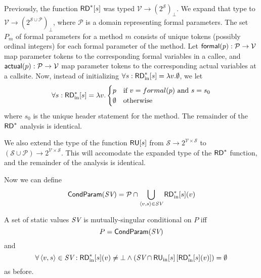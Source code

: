 \documentclass[11pt,notitlepage]{article}
\newcommand{\bigvar}[1]{\ensuremath{\text{\it #1}}}
\newcommand{\func}[1]{\ensuremath{\text{\sffamily #1}}}
\begin{document}
Previously, the function $\func{RD}^*[s]$ was typed
$\mathcal{V}\to(2^\mathcal{S})_\bot$.  We expand that type to
$\mathcal{V}\to(2^{\mathcal{S}\cup\mathcal{P}})_\bot$, where
$\mathcal{P}$ is a domain
representing formal parameters.  The set $P_m$ of formal parameters for
a method $m$ consists of unique tokens (possibly ordinal integers) for
each formal parameter of the method.  Let
$\func{formal}(p):\mathcal{P\to V}$ map parameter tokens to the
corresponding formal variables in a callee, and
$\func{actual}(p):\mathcal{P\to V}$ map parameter tokens to the
corresponding actual variables at a callsite.
Now, instead of initializing $\forall s :
\func{RD}^*_\text{in}[s]=\lambda v.\emptyset$, we let
\begin{displaymath}
\forall s: \func{RD}^*_\text{in}[s]=\lambda v.\begin{cases}
p & \text{if }v=formal(p)\text{ and }s=s_0\\
\emptyset & \text{otherwise} \\
\end{cases}
\end{displaymath}
where $s_0$ is the unique header statement for the method.
The remainder of the $\func{RD}^*$ analysis is identical.

We also extend the type of the function $\func{RU}[s]$ from
$\mathcal{S}\to 2^\mathcal{V\times S}$ to
$(\mathcal{S}\cup\mathcal{P})\to 2^\mathcal{V\times S}$.
This will accomodate the expanded type of the $\func{RD}^*$ function,
and the remainder of the analysis is identical.

Now we can define
\begin{displaymath}
\func{CondParam}(\bigvar{SV}) = \mathcal{P} \cap
    \bigcup_{\tuple{v,s}\in\bigvar{SV}} \func{RD}^*_\text{in}[s](v)
\end{displaymath}

A set of static values $\bigvar{SV}$ is
mutually-singular conditional on $P$ iff
$$P=\func{CondParam}(\bigvar{SV})$$ and
\begin{displaymath}
  \forall \tuple{v,s}\in \bigvar{SV} : \func{RD}^*_\text{in}[s](v) \neq \bot
  \wedge 
  \left(\bigvar{SV}\cap\func{RU}_\text{in}[s]\left[\func{RD}^*_\text{in}[s](v)\right]\right) = \emptyset
\end{displaymath}
as before.
\end{document}
